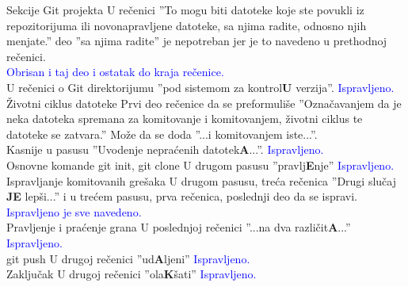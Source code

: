 \documentclass[a4paper]{report}
\newcommand{\odgovor}[1]{\textcolor{blue}{#1}}
\begin{document}
Sekcije Git projekta\newline
U rečenici ''To mogu biti datoteke koje ste povukli iz repozitorijuma ili novonapravljene datoteke, sa njima radite, odnosno njih menjate.'' deo ''sa njima radite'' je nepotreban jer je to navedeno u prethodnoj rečenici.\\
\odgovor{Obrisan i taj deo i ostatak do kraja rečenice.}\\

U rečenici o Git direktorijumu ''pod sistemom za kontrol\textbf{U} verzija''.\newline
\odgovor{Ispravljeno.}\\

Životni ciklus datoteke
Prvi deo rečenice da se preformuliše ''Označavanjem da je neka datoteka spremana za komitovanje i
komitovanjem, životni ciklus te datoteke se zatvara.'' Može da se doda ''...i komitovanjem iste...''.\\

Kasnije u pasusu ''Uvodenje nepraćenih datotek\textbf{A}...''.\newline
\odgovor{Ispravljeno.}\\

Osnovne komande\newline
git init, git clone \newline
U drugom pasusu ''pravlj\textbf{E}nje''\newline
\odgovor{Ispravljeno.}\\

Ispravljanje komitovanih grešaka\newline
U drugom pasusu, treća rečenica  ''Drugi slučaj \textbf{JE} lepši...'' i u trećem pasusu, prva rečenica, poslednji deo da se ispravi.\newline
\odgovor{Ispravljeno je sve navedeno.}\\

Pravljenje i praćenje grana\newline
U poslednjoj rečenici ''...na dva različit\textbf{A}...''\newline
\odgovor{Ispravljeno.}\\

git push\newline
U drugoj rečenici ''ud\textbf{A}ljeni''\newline
\odgovor{Ispravljeno.}\\

Zaključak\newline
U drugoj rečenici ''ola\textbf{K}šati''\newline
\odgovor{Ispravljeno.}\\
\end{document}
